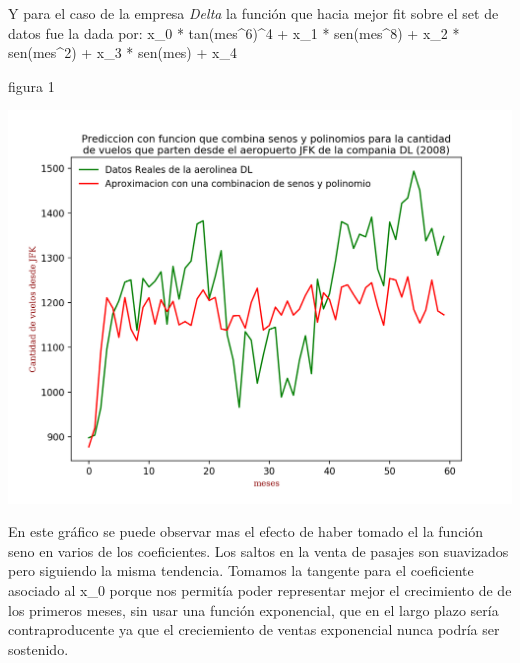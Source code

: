 Y para el caso de la empresa \textit{Delta} la funci\'on que hacia mejor fit sobre el set de datos fue la dada por:
x_0 * tan(mes^6)^4 + x_1 * sen(mes^8) + x_2 * sen(mes^2) + x_3 * sen(mes) +  x_4


\begin{center}
\caption{figura 1}
\includegraphics[scale=0.7]{imagenes/DL.png}
\end{center}

En este gr\'afico se puede observar mas el efecto de haber tomado el la funci\'on seno en varios de los coeficientes. Los saltos en la venta de pasajes son suavizados pero siguiendo la misma tendencia. Tomamos la tangente para el coeficiente asociado al x_0 porque nos permit\'ia poder representar mejor el crecimiento de de los primeros meses, sin usar una funci\'on exponencial, que en el largo plazo ser\'ia contraproducente ya que el creciemiento de ventas exponencial nunca podr\'ia ser sostenido.

